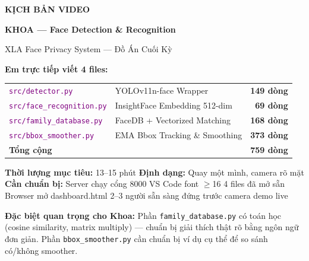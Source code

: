 \documentclass[12pt, a4paper]{article}
\newcommand{\fpath}[1]{\texttt{\textcolor{purple}{#1}}}
\begin{document}

\begin{titlepage}
\centering\vspace*{1.5cm}
{\Huge\bfseries\color{OliveGreen!80!black} KỊCH BẢN VIDEO\par}
\vspace{0.3cm}
{\LARGE\bfseries\color{OliveGreen!70!black} KHOA --- Face Detection \& Recognition\par}
\vspace{0.5cm}
{\large\color{gray} XLA Face Privacy System --- Đồ Án Cuối Kỳ\par}
\vspace{1.2cm}

\begin{tcolorbox}[colback=OliveGreen!7, colframe=OliveGreen!80!black, width=0.9\textwidth]
\centering\large
\textbf{Em trực tiếp viết 4 files:}\\[0.4cm]
\renewcommand{\arraystretch}{1.5}
\begin{tabular}{llr}
  \hline
  \fpath{src/detector.py} & YOLOv11n-face Wrapper & \textbf{149 dòng} \\
  \fpath{src/face\_recognition.py} & InsightFace Embedding 512-dim & \textbf{69 dòng} \\
  \fpath{src/family\_database.py} & FaceDB + Vectorized Matching & \textbf{168 dòng} \\
  \fpath{src/bbox\_smoother.py} & EMA Bbox Tracking \& Smoothing & \textbf{373 dòng} \\
  \hline
  \multicolumn{2}{l}{\textbf{Tổng cộng}} & \textbf{759 dòng} \\
  \hline
\end{tabular}
\end{tcolorbox}

\vspace{0.8cm}
\begin{tcolorbox}[colback=gray!6, colframe=gray!50, width=0.9\textwidth]
\textbf{Thời lượng mục tiêu:} 13--15 phút\quad
\textbf{Định dạng:} Quay một mình, camera rõ mặt\\[0.2cm]
\textbf{Cần chuẩn bị:}
Server chạy cổng 8000 \textbullet{}
VS Code font $\geq$16 \textbullet{}
4 files đã mở sẵn \textbullet{}
Browser mở dashboard.html \textbullet{}
2--3 người sẵn sàng đứng trước camera demo live
\end{tcolorbox}

\vspace{0.8cm}
\begin{warn}
\textbf{Đặc biệt quan trọng cho Khoa:}
Phần \texttt{family\_database.py} có toán học (cosine similarity, matrix multiply) --- chuẩn bị giải thích thật rõ bằng ngôn ngữ đơn giản.
Phần \texttt{bbox\_smoother.py} cần chuẩn bị ví dụ cụ thể để so sánh có/không smoother.
\end{warn}
\end{titlepage}
\end{document}
